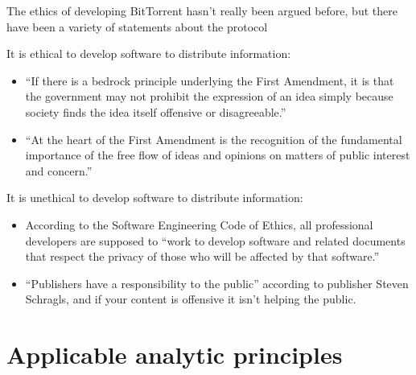 \documentclass[11pt]{article}
\begin{document}
The ethics of developing BitTorrent hasn't really been argued before, but there have been a variety of statements about the protocol

It is ethical to develop software to distribute information:
\begin{itemize}
\item ``If there is a bedrock principle underlying the First Amendment, it is that the government may not prohibit the expression of an idea simply because society finds the idea itself offensive or disagreeable.'' \cite[414]{1989texas}
\item ``At the heart of the First Amendment is the recognition of the fundamental importance of the free flow of ideas and opinions on matters of public interest and concern.'' \cite[51]{1988hustler}
\end{itemize}

It is unethical to develop software to distribute information:
\begin{itemize}
\item According to the Software Engineering Code of Ethics, all professional developers are supposed to ``work to develop software and related documents that respect the privacy of those who will be affected by that software.'' \cite{secode}
\item ``Publishers have a responsibility to the public'' according to publisher Steven Schragls, and if your content is offensive it isn't helping the public. \cite[46]{hawker}
\end{itemize}

\section{Applicable analytic principles}
\end{document}
